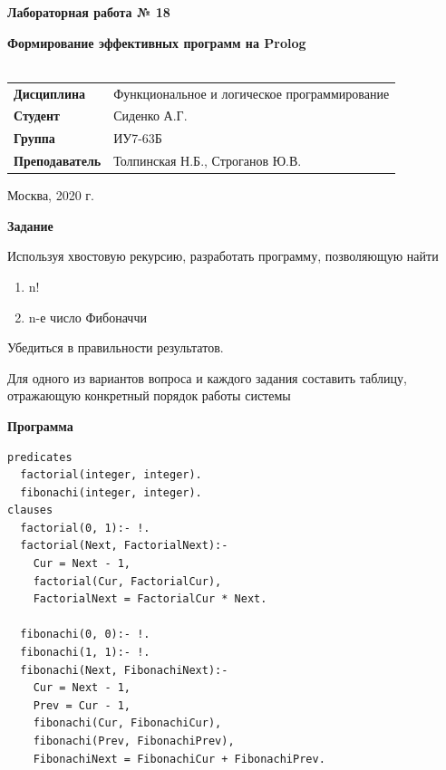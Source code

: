 \documentclass[a4paper,14pt]{extreport} %
\begin{document}
\begin{titlepage}
    \vspace{4cm}

    \begin{center}
        \textbf{Лабораторная работа № 18} \\ 
        \hfill
        
        \textbf{Формирование эффективных программ на Prolog} \\
        \vspace{0.5cm}
        \textbf{} \\
    \end{center}

    \vspace{4cm}

    \begin{flushleft}
        \begin{tabular}{ll}
            \textbf{Дисциплина} & Функциональное и логическое программирование \\
            \textbf{Студент} & Сиденко А.Г. \\
            \textbf{Группа} & ИУ7-63Б \\
            \textbf{Преподаватель} & Толпинская Н.Б., Строганов Ю.В.  \\
        \end{tabular}
    \end{flushleft}

    \vspace{4cm}

   \begin{center}
        Москва, 2020 г.
    \end{center}

\end{titlepage}

\textbf{Задание}

Используя хвостовую рекурсию, разработать программу, позволяющую найти 

\begin{enumerate}
\item n!
\item n-е число Фибоначчи
\end{enumerate}

Убедиться в правильности результатов.

Для одного из вариантов вопроса и каждого задания составить таблицу, отражающую конкретный порядок работы системы

\hfill

\textbf{Программа}

\begin{lstlisting}
predicates
  factorial(integer, integer).
  fibonachi(integer, integer).
clauses
  factorial(0, 1):- !.
  factorial(Next, FactorialNext):- 
    Cur = Next - 1, 
    factorial(Cur, FactorialCur),
    FactorialNext = FactorialCur * Next.
    
  fibonachi(0, 0):- !.
  fibonachi(1, 1):- !.
  fibonachi(Next, FibonachiNext):- 
    Cur = Next - 1,
    Prev = Cur - 1,
    fibonachi(Cur, FibonachiCur),
    fibonachi(Prev, FibonachiPrev),
    FibonachiNext = FibonachiCur + FibonachiPrev.
\end{lstlisting}
\end{document}
